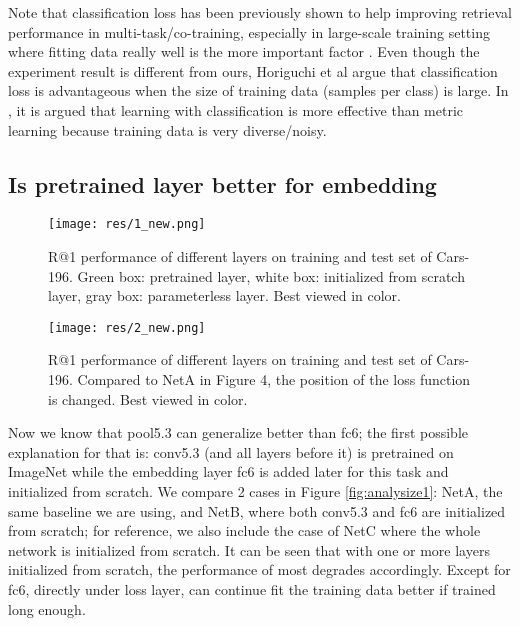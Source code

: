 \documentclass[10pt,twocolumn,letterpaper]{article}
\begin{document}
Note that classification loss has been previously shown to help improving retrieval performance in multi-task/co-training, especially in large-scale training setting where fitting data really well is the more important factor \cite{Parkhi15, wen2016discriminative}. Even though the experiment result is different from ours, Horiguchi et al \cite{horiguchi2017significance} argue that classification loss is advantageous when the size of training data (samples per class) is large. In \cite{vo2017revisiting}, it is argued that learning with classification is more effective than metric learning because training data is very diverse/noisy.


\subsection{Is pretrained layer better for embedding}

\begin{figure*}[h!]
\begin{center}
  \texttt{[image: res/1\_new.png]}
  \vspace{5pt}
  \caption{R@1 performance of different layers on training and test set of Cars-196. Green box: pretrained layer, white box: initialized from scratch layer, gray box: parameterless layer. Best viewed in color.}
  \label{fig:analysize1}
\end{center}

\begin{center}
  \texttt{[image: res/2\_new.png]}
  \vspace{5pt}
  \caption{R@1 performance of different layers on training and test set of Cars-196. Compared to NetA in Figure 4, the position of the loss function is changed. Best viewed in color.}
  \label{fig:analysize2}
\end{center}
\end{figure*}


Now we know that pool5.3 can generalize better than fc6; the first possible explanation for that is: conv5.3 (and all layers before it) is pretrained on ImageNet while the embedding layer fc6 is added later for this task and initialized from scratch. We compare 2 cases in Figure \ref{fig:analysize1}: NetA, the same baseline we are using, and NetB, where both conv5.3 and fc6 are initialized from scratch; for reference, we also include the case of NetC where the whole network is initialized from scratch.
It can be seen that with one or more layers initialized from scratch, the performance of most degrades accordingly. Except for fc6, directly under loss layer, can continue fit the training data better if trained long enough.
\end{document}
